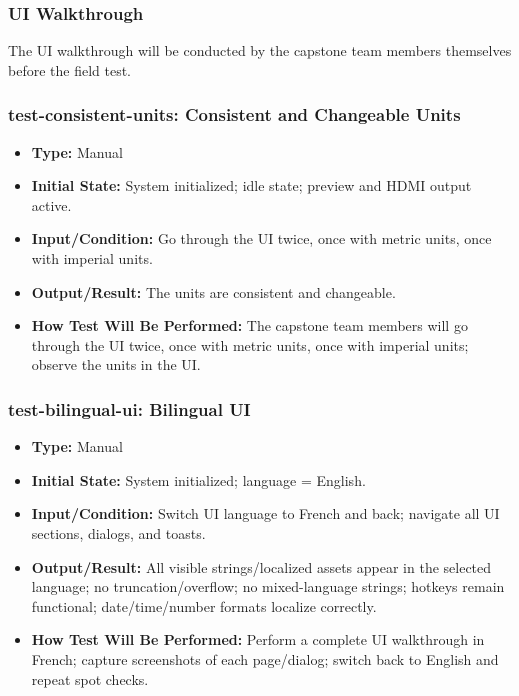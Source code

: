 \documentclass[12pt, titlepage]{article}
\begin{document}
\subsubsection{UI Walkthrough}

The UI walkthrough will be conducted by the capstone team members themselves
before the field test.

\subsubsection*{test-consistent-units: Consistent and Changeable Units}
\begin{itemize}
  \item \textbf{Type:} Manual
  \item \textbf{Initial State:} System initialized; idle state; preview and HDMI output active.
  \item \textbf{Input/Condition:} Go through the UI twice, once with metric units, once with imperial units.
  \item \textbf{Output/Result:} The units are consistent and changeable.
  \item \textbf{How Test Will Be Performed:} The capstone team members will go through the UI twice, once with metric units, once with imperial units; observe the units in the UI.
\end{itemize}

\subsubsection*{test-bilingual-ui: Bilingual UI}
\begin{itemize}
  \item \textbf{Type:} Manual
  \item \textbf{Initial State:} System initialized; language = English.
  \item \textbf{Input/Condition:} Switch UI language to French and back; navigate all UI sections, dialogs, and toasts.
  \item \textbf{Output/Result:} All visible strings/localized assets appear in the selected language; no truncation/overflow; no mixed-language strings; hotkeys remain functional; date/time/number formats localize correctly.
  \item \textbf{How Test Will Be Performed:} Perform a complete UI walkthrough in French; capture screenshots of each page/dialog; switch back to English and repeat spot checks.
\end{itemize}
\end{document}
